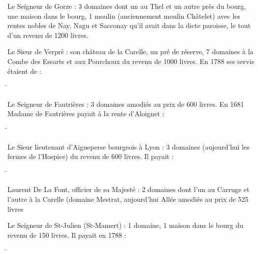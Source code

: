Le Seigneur de Gorze : 3 domaines dont un au Thel et un autre près
du bourg, une maison dans le bourg, 1 moulin (anciennement moulin Châtelet) avec les rentes nobles de Nay, Nagu et Sacconay qu'il avait
dans la dicte paroisse, le tout d'un revenu de 1200 livres.

Le Sieur de Verpré : son château de la Carelle, un pré de réserve,
7 domaines à la Combe des Essarts et aux Pourchoux du revenu de 1000
livres. En 1788 ses servis étaient de :
\begin{tabbing}
\hspace{0.38\textwidth}\=\kill
{}
\end{tabbing}

Le Seigneur de Fautrières : 3 domaines amodiés au prix de 600
livres. En 1681 Madame de Fautrières payait à la rente d'Aloignet :
\begin{tabbing}
\hspace{0.38\textwidth}\=\kill
{}
\end{tabbing}

Le Sieur lieutenant d'Aigueperse bourgeois à Lyon : 3 domaines
(aujourd'hui les fermes de l'Hospice) du revenu de 600 livres. Il
payait :
\begin{tabbing}
\hspace{0.38\textwidth}\=\kill
{}
\end{tabbing}

Laurent De La Font, officier de sa Majesté : 2 domaines dont l'un
au Carruge et l'autre à la Carelle (domaine Mestrat, aujourd'hui Allée
amodiés au prix de 525 livres

Le Seigneur de St-Julien (St-Mamert) : 1 domaine, 1 maison dans le
bourg du revenu de 150 livres. Il payait en 1788 :
\begin{tabbing}
\hspace{0.38\textwidth}\=\kill
{}
\end{tabbing}

